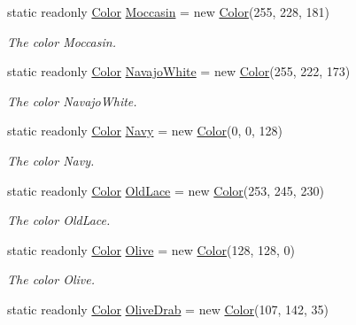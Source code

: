 \begin{DoxyCompactItemize}
static readonly \hyperlink{struct_tri_devs_1_1_tri_engine_1_1_color}{Color} \hyperlink{struct_tri_devs_1_1_tri_engine_1_1_color_a39be3b920f7db0c555fc245e8a0dd127}{Moccasin} = new \hyperlink{struct_tri_devs_1_1_tri_engine_1_1_color}{Color}(255, 228, 181)
\begin{DoxyCompactList}\small\item\em The color Moccasin. \end{DoxyCompactList}\item 
static readonly \hyperlink{struct_tri_devs_1_1_tri_engine_1_1_color}{Color} \hyperlink{struct_tri_devs_1_1_tri_engine_1_1_color_a952ea6f9d5a1177039d21902cd13ba0a}{Navajo\-White} = new \hyperlink{struct_tri_devs_1_1_tri_engine_1_1_color}{Color}(255, 222, 173)
\begin{DoxyCompactList}\small\item\em The color Navajo\-White. \end{DoxyCompactList}\item 
static readonly \hyperlink{struct_tri_devs_1_1_tri_engine_1_1_color}{Color} \hyperlink{struct_tri_devs_1_1_tri_engine_1_1_color_a32ffc00095e679b07fc1da8b59ff4f5e}{Navy} = new \hyperlink{struct_tri_devs_1_1_tri_engine_1_1_color}{Color}(0, 0, 128)
\begin{DoxyCompactList}\small\item\em The color Navy. \end{DoxyCompactList}\item 
static readonly \hyperlink{struct_tri_devs_1_1_tri_engine_1_1_color}{Color} \hyperlink{struct_tri_devs_1_1_tri_engine_1_1_color_ad00eb6d4c15ee1b07cabe6aa7f8258be}{Old\-Lace} = new \hyperlink{struct_tri_devs_1_1_tri_engine_1_1_color}{Color}(253, 245, 230)
\begin{DoxyCompactList}\small\item\em The color Old\-Lace. \end{DoxyCompactList}\item 
static readonly \hyperlink{struct_tri_devs_1_1_tri_engine_1_1_color}{Color} \hyperlink{struct_tri_devs_1_1_tri_engine_1_1_color_a2287c129b1d4d161e05c072480abe02d}{Olive} = new \hyperlink{struct_tri_devs_1_1_tri_engine_1_1_color}{Color}(128, 128, 0)
\begin{DoxyCompactList}\small\item\em The color Olive. \end{DoxyCompactList}\item 
static readonly \hyperlink{struct_tri_devs_1_1_tri_engine_1_1_color}{Color} \hyperlink{struct_tri_devs_1_1_tri_engine_1_1_color_a7486e2ac75e8ad49403df9d9424479a5}{Olive\-Drab} = new \hyperlink{struct_tri_devs_1_1_tri_engine_1_1_color}{Color}(107, 142, 35)

\end{DoxyCompactItemize}

